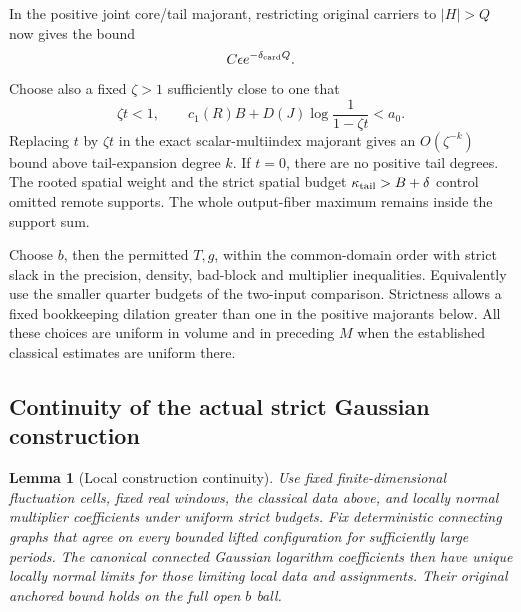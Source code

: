 \documentclass[11pt]{article}
\newtheorem{lemma}[theorem]{Lemma}
\theoremstyle{remark}
\begin{document}
In the positive joint core/tail majorant, restricting original
carriers to \(|H|>Q\) now gives the bound
\begin{equation}
 C\epsilon e^{-\delta_{\rm card}Q}.
 \label{qll-input-carrier-tail}
\end{equation}
Choose also a fixed \(\zeta>1\) sufficiently close to one that
\begin{equation}
 \zeta t<1,\qquad
 c_1(R)B+D(J)\log\frac1{1-\zeta t}<a_0.
 \label{qll-tail-degree-margin}
\end{equation}
Replacing \(t\) by \(\zeta t\) in the exact scalar-multiindex
majorant gives an \(O(\zeta^{-k})\) bound above tail-expansion
degree \(k\). If \(t=0\), there are no positive tail degrees.
The rooted spatial weight and the strict spatial budget
\(\kappa_{\rm tail}>B+\delta\) control omitted remote supports.
The whole output-fiber maximum remains inside the support sum.

Choose \(b\), then the permitted \(T,g\), within the common-domain
order with strict slack in the precision, density, bad-block
and multiplier inequalities. Equivalently use the smaller
quarter budgets of the two-input comparison. Strictness allows
a fixed bookkeeping dilation greater than one in the positive
majorants below. All these choices are uniform in volume and
in preceding \(M\) when the established classical estimates
are uniform there.

\subsection{Continuity of the actual strict Gaussian construction}
\label{qll-Gaussian-section}

\begin{lemma}[Local construction continuity]
\label{qll-Gaussian-lemma}
Use fixed finite-dimensional fluctuation cells, fixed real
windows, the classical data above, and locally normal multiplier
coefficients under uniform strict budgets. Fix deterministic
connecting graphs that agree on every bounded lifted
configuration for sufficiently large periods. The canonical
connected Gaussian logarithm coefficients then have unique
locally normal limits for those limiting local data and
assignments. Their original anchored bound holds on the full
open \(b\) ball.
\end{lemma}
\end{document}
